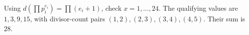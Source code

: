Using $d(\prod p_i^{e_i})=\prod(e_i+1)$, check $x=1,\ldots,24$. The qualifying values are $1,3,9,15$, with divisor-count pairs $(1,2),(2,3),(3,4),(4,5)$. Their sum is $\boxed{28}$.

